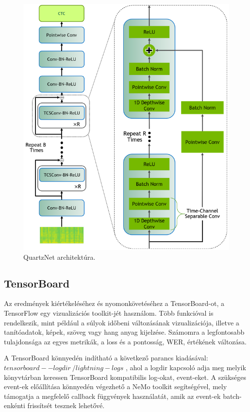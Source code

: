 \begin{figure}[!ht]
\centering
\includegraphics[width=150mm, keepaspectratio]{figures/QuartzNet-architecture.png}
\caption{QuartzNet architektúra. \cite{nemo}}
\label{fig:TeXstudio}
\end{figure}

\subsection{TensorBoard}

Az eredmények kiértékeléséhez és nyomonkövetéséhez a TensorBoard-ot, a TensorFlow egy vizualizációs toolkit-jét használom. Több funkcióval is rendelkezik, mint például a súlyok időbeni változásának vizualizációja, illetve a tanítóadatok, képek, szöveg vagy hang anyag kijelzése. Számomra a legfontosabb tulajdonsága az egyes metrikák, a loss és a pontosság, WER, értékének változása.

A TensorBoard könnyedén indítható a következő parancs kiadásával: $tensorboard --logdir ~/lightning-logs$ , ahol a logdir kapcsoló adja meg melyik könyvtárban keressen TensorBoard kompatibilis log-okat, event-eket. A szükséges event-ek előállítása könnyedén végezhető a NeMo toolkit segítségével, mely támogatja a megfelelő callback függvények használatát, amik az event-ek batch-enkénti frissítsét tesznek lehetővé.

